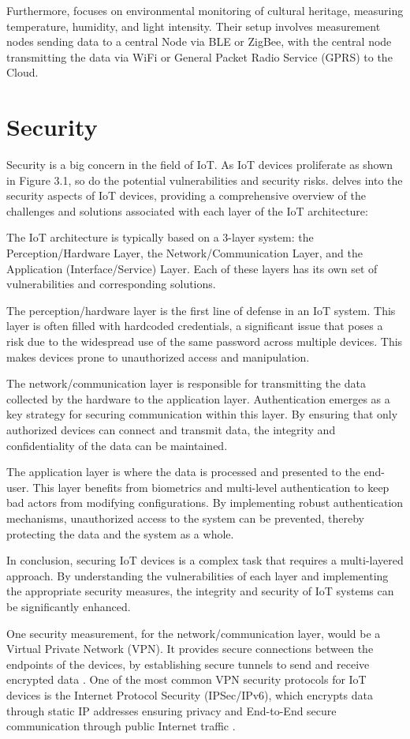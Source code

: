 Furthermore, \cite{Hinostroza2022} focuses on environmental monitoring of cultural heritage, measuring temperature, humidity, and light intensity. Their setup involves measurement nodes sending data to a central Node via BLE or ZigBee, with the central node transmitting the data via WiFi or General Packet Radio Service (GPRS) to the Cloud.

\section{Security}
Security is a big concern in the field of IoT. As IoT devices proliferate as shown in Figure 3.1, so do the potential vulnerabilities and security risks. \cite{Noor2019} delves into the security aspects of IoT devices, providing a comprehensive overview of the challenges and solutions associated with each layer of the IoT architecture:

The IoT architecture is typically based on a 3-layer system: the Perception/Hardware Layer, the Network/Communication Layer, and the Application (Interface/Service) Layer. Each of these layers has its own set of vulnerabilities and corresponding solutions.

The perception/hardware layer is the first line of defense in an IoT system. This layer is often filled with hardcoded credentials, a significant issue that poses a risk due to the widespread use of the same password across multiple devices. This makes devices prone to unauthorized access and manipulation.

The network/communication layer is responsible for transmitting the data collected by the hardware to the application layer. Authentication emerges as a key strategy for securing communication within this layer. By ensuring that only authorized devices can connect and transmit data, the integrity and confidentiality of the data can be maintained.

The application layer is where the data is processed and presented to the end-user. This layer benefits from biometrics and multi-level authentication to keep bad actors from modifying configurations. By implementing robust authentication mechanisms, unauthorized access to the system can be prevented, thereby protecting the data and the system as a whole.

In conclusion, securing IoT devices is a complex task that requires a multi-layered approach. By understanding the vulnerabilities of each layer and implementing the appropriate security measures, the integrity and security of IoT systems can be significantly enhanced.

One security measurement, for the network/communication layer, would be a Virtual Private Network (VPN). It provides secure connections between the endpoints of the devices, by establishing secure tunnels to send and receive encrypted data \cite{JUMA2020102598}. One of the most common VPN security protocols for IoT devices is the Internet Protocol Security (IPSec/IPv6), which encrypts data through static IP addresses ensuring privacy and End-to-End secure communication through public Internet traffic \cite{JUMA2020102598}.
